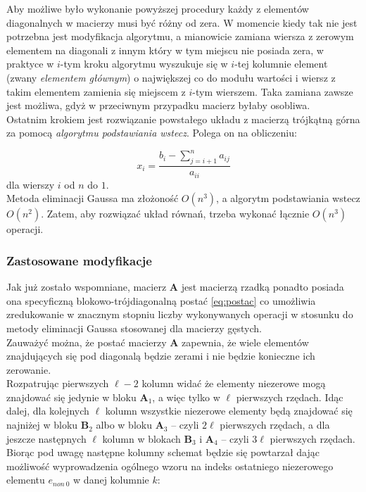 \documentclass{mk-polish-lab-report}
\newcommand{\mA}{\bm{A}}
\newcommand{\mB}{\bm{B}}
\begin{document}
\noindent Aby możliwe było wykonanie powyższej procedury każdy z elementów diagonalnych w macierzy musi być różny od zera. W momencie kiedy tak nie jest potrzebna jest modyfikacja algorytmu, a mianowicie zamiana wiersza z zerowym elementem na diagonali z innym który w tym miejscu nie posiada zera, w praktyce w $i$-tym kroku algorytmu wyszukuje się w $i$-tej kolumnie element (zwany \emph{elementem głównym}) o największej co do modułu wartości i wiersz z takim elementem zamienia się miejscem z $i$-tym wierszem. Taka zamiana zawsze jest możliwa, gdyż w przeciwnym przypadku macierz byłaby osobliwa. \\

\noindent Ostatnim krokiem jest rozwiązanie powstałego układu z macierzą trójkątną górna za pomocą \emph{algorytmu podstawiania wstecz}. Polega on na obliczeniu:

\begin{equation*}
x_i = \frac{b_i - \sum_{j = i+1}^n a_{ij}}{a_{ii}}
\end{equation*}
dla wierszy $i$ od $n$ do $1$.  \\

\noindent Metoda eliminacji Gaussa ma złożoność $O(n^3)$, a algorytm podstawiania wstecz $O(n^2)$. Zatem, aby rozwiązać układ równań, trzeba wykonać łącznie $O(n^3)$ operacji.

\subsubsection{Zastosowane modyfikacje}

Jak już zostało wspomniane, macierz $\mA$ jest macierzą rzadką ponadto posiada ona specyficzną blokowo-trójdiagonalną postać \eqref{eq:postac} co umożliwia zredukowanie w znacznym stopniu liczby wykonywanych operacji w stosunku do metody eliminacji Gaussa stosowanej dla macierzy gęstych. \\

\noindent Zauważyć można, że postać macierzy $\mA$ zapewnia, że wiele elementów znajdujących się pod diagonalą będzie zerami i nie będzie konieczne ich zerowanie. \\

\noindent Rozpatrując pierwszych $\ell-2$ kolumn widać że elementy niezerowe mogą znajdować się jedynie w bloku $\mA_1$, a więc tylko w $\ell$ pierwszych rzędach. Idąc dalej, dla kolejnych $\ell$ kolumn wszystkie niezerowe elementy będą znajdować się najniżej w bloku $\mB_2$ albo w bloku $\mA_3$ -- czyli $2\ell$ pierwszych rzędach, a dla jeszcze następnych $\ell$ kolumn w blokach $\mB_3$ i $\mA_4$ -- czyli $3\ell$ pierwszych rzędach. Biorąc pod uwagę następne kolumny schemat będzie się powtarzał dając możliwość wyprowadzenia ogólnego wzoru na indeks ostatniego niezerowego elementu $e_{non~0}$ w danej kolumnie $k$:
\end{document}
